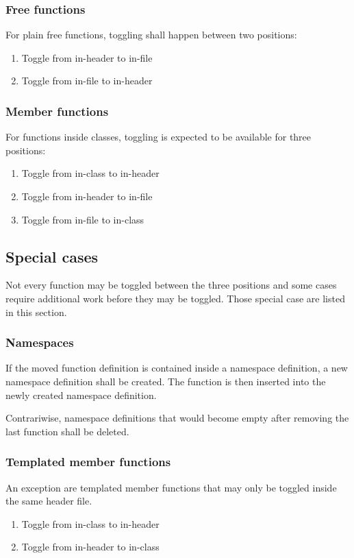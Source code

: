 \subsubsection{Free functions}
For plain free functions, toggling shall happen between two positions:
\begin{enumerate}
\item Toggle from in-header to in-file
\item Toggle from in-file to in-header
\end{enumerate}

\subsubsection{Member functions}
For functions inside classes, toggling is expected to be available for three 
positions:
\begin{enumerate}
\item Toggle from in-class to in-header
\item Toggle from in-header to in-file
\item Toggle from in-file to in-class
\end{enumerate}

\subsection{Special cases}

Not every function may be toggled between the three positions and some cases 
require additional work before they may be toggled. Those special case are 
listed in this section.

\subsubsection{Namespaces}

If the moved function definition is contained inside a namespace definition, a 
new namespace definition shall be created. The function is then inserted into 
the newly created namespace definition.

Contrariwise, namespace definitions that would become empty after removing the 
last function shall be deleted.

\subsubsection{Templated member functions}

An exception are templated member functions that may only be toggled inside the 
same header file.
\begin{enumerate}
\item Toggle from in-class to in-header
\item Toggle from in-header to in-class
\end{enumerate}

